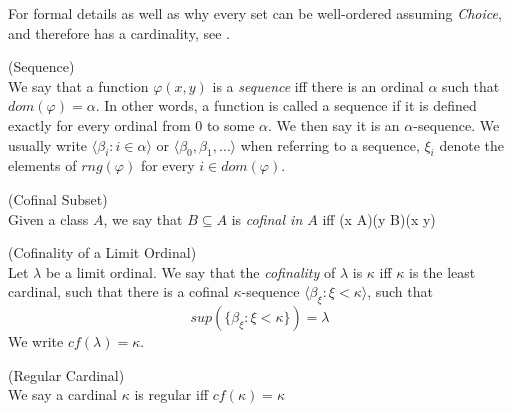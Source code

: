For formal details as well as why every set can be well-ordered assuming \emph{Choice}, and therefore has a cardinality, see \cite{JechBook}. %


\begin{definition}{(Sequence)}\label{def:sequence}\\
We say that a function $\varphi(x, y)$ is a \emph{sequence} iff there is an ordinal $\alpha$ such that $dom(\varphi) = \alpha$. In other words, a function is called a sequence if it is defined exactly for every ordinal from $0$ to some $\alpha$. We then say it is an $\alpha$-sequence. We usually write $\langle \beta_i : i \in \alpha \rangle$ or $\langle \beta_0, \beta_1, \ldots \rangle$ when referring to a sequence, $\xi_i$ denote the elements of $rng(\varphi)$ for every $i \in dom(\varphi)$.
\end{definition}

\begin{definition}{(Cofinal Subset)}\label{def:cofinal_subset}\\
Given a class $A$, we say that $B \subseteq A$ is \emph{cofinal in $A$} iff
\beq
(\forall x \in A)(\exists y \in B)(x \in y)
\eeq
\end{definition}

\begin{definition}{(Cofinality of a Limit Ordinal)}\label{def:cofinality}\\ %
Let $\lambda$ be a limit ordinal. We say that the \emph{cofinality} of $\lambda$ is $\kappa$ iff $\kappa$ is the least cardinal, such that there is a cofinal $\kappa$-sequence $\langle \beta_\xi : \xi < \kappa \rangle$, such that
\begin{equation}
sup(\{\beta_\xi: \xi < \kappa\}) = \lambda
\end{equation}
We write $cf(\lambda) = \kappa$.
\end{definition}

\begin{definition}{(Regular Cardinal)}\label{def:regular_cardinal}\\
We say a cardinal $\kappa$ is regular iff $cf(\kappa) = \kappa$
\end{definition}


